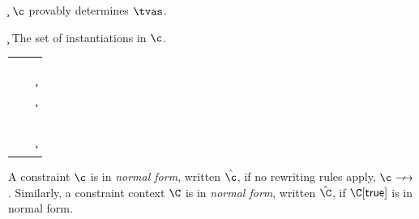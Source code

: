 \documentclass[acmsmall,screen,nonacm%
\Anonymous{,anonymous}{}%
\Final{}{,review}%
]{acmart}
\begin{document}
\begin{judgboxmathpar}
  {\th \cdetermines \c \tvs}
  {$\c$ provably determines $\tvs$.}

    {\th \cdetermines {\cexists \tvbs \c \cand \cunif \tvc \ueq} \tvs}

    {\th \cdetermines {\cexists \tvbs \c \cand \cunif \tvs {\cunif \t \ueq}} \tvs}
\end{judgboxmathpar}

\begin{judgboxmathpar}
  {\insts \c}
  {The set of instantiations in $\c$.}
  \newcommand{\Srule}[2]{#1 &\eqdef& #2}
  \begin{tabular}{RCL}
    \Srule{\insts \ctrue}{\eset}\\
    \Srule{\insts \cfalse}{\eset}\\
    \Srule{\insts {\ca \cand \cb}}{\insts \ca \cup \insts \cb}\\
    \Srule{\insts {\cexists \tv \c}}{\insts \c}\\
    \Srule{\insts {\cfor \tv \c}}{\insts \c}\\
    \Srule{\insts {\cunif \t \tp}}{\eset}\\
    \Srule{\insts {\clet \x \tv \ca \cb}}{\insts \ca \cup \insts \cb}\\
    \Srule{\insts {\capp \x \t}}{\eset}\\
    \Srule{\insts {\ueq}}{\eset}\\
    \Srule{\insts {\cletr \x \tv \tvs \ca \cb}}{\insts \ca \cup \insts \cb}\\
    \Srule{\insts {\cexistsi \inst \x \c}}{\insts \c}\\
    \Srule{\insts {\cpinst \inst \tv \t}}{\set {\inst(\tv)}}
  \end{tabular}
\end{judgboxmathpar}


\begin{definition}
  \label{def/normal-forms-appendix}
  A constraint $\c$ is in \emph{normal form}, written $\hat\c$, if no 
  rewriting rules apply, \ie $\c \cnsolve$. Similarly, a constraint context 
  $\C$ is in \emph{normal form}, written $\hat\C$, if $\C\where\ctrue$ is in normal form.
\end{definition}
\end{document}

